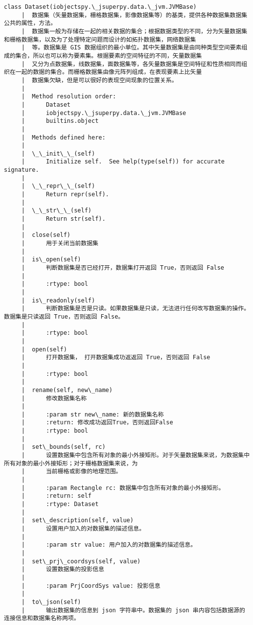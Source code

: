 \documentclass[11pt]{article}
\begin{document}
\begin{Verbatim}[commandchars=\\\{\}]
    class Dataset(iobjectspy.\_jsuperpy.data.\_jvm.JVMBase)
     |  数据集（矢量数据集，栅格数据集，影像数据集等）的基类，提供各种数据集数据集公共的属性，方法。
     |  数据集一般为存储在一起的相关数据的集合；根据数据类型的不同，分为矢量数据集和栅格数据集，以及为了处理特定问题而设计的如拓扑数据集，网络数据集
     |  等。数据集是 GIS 数据组织的最小单位。其中矢量数据集是由同种类型空间要素组成的集合，所以也可以称为要素集。根据要素的空间特征的不同，矢量数据集
     |  又分为点数据集，线数据集，面数据集等，各矢量数据集是空间特征和性质相同而组织在一起的数据的集合。而栅格数据集由像元阵列组成，在表现要素上比矢量
     |  数据集欠缺，但是可以很好的表现空间现象的位置关系。
     |  
     |  Method resolution order:
     |      Dataset
     |      iobjectspy.\_jsuperpy.data.\_jvm.JVMBase
     |      builtins.object
     |  
     |  Methods defined here:
     |  
     |  \_\_init\_\_(self)
     |      Initialize self.  See help(type(self)) for accurate signature.
     |  
     |  \_\_repr\_\_(self)
     |      Return repr(self).
     |  
     |  \_\_str\_\_(self)
     |      Return str(self).
     |  
     |  close(self)
     |      用于关闭当前数据集
     |  
     |  is\_open(self)
     |      判断数据集是否已经打开，数据集打开返回 True，否则返回 False
     |      
     |      :rtype: bool
     |  
     |  is\_readonly(self)
     |      判断数据集是否是只读。如果数据集是只读，无法进行任何改写数据集的操作。 数据集是只读返回 True，否则返回 False。
     |      
     |      :rtype: bool
     |  
     |  open(self)
     |      打开数据集， 打开数据集成功返返回 True，否则返回 False
     |      
     |      :rtype: bool
     |  
     |  rename(self, new\_name)
     |      修改数据集名称
     |      
     |      :param str new\_name: 新的数据集名称
     |      :return: 修改成功返回True，否则返回False
     |      :rtype: bool
     |  
     |  set\_bounds(self, rc)
     |      设置数据集中包含所有对象的最小外接矩形。对于矢量数据集来说，为数据集中所有对象的最小外接矩形；对于栅格数据集来说，为
     |      当前栅格或影像的地理范围。
     |      
     |      :param Rectangle rc: 数据集中包含所有对象的最小外接矩形。
     |      :return: self
     |      :rtype: Dataset
     |  
     |  set\_description(self, value)
     |      设置用户加入的对数据集的描述信息。
     |      
     |      :param str value: 用户加入的对数据集的描述信息。
     |  
     |  set\_prj\_coordsys(self, value)
     |      设置数据集的投影信息
     |      
     |      :param PrjCoordSys value: 投影信息
     |  
     |  to\_json(self)
     |      输出数据集的信息到 json 字符串中。数据集的 json 串内容包括数据源的连接信息和数据集名称两项。

\end{Verbatim}
\end{document}
